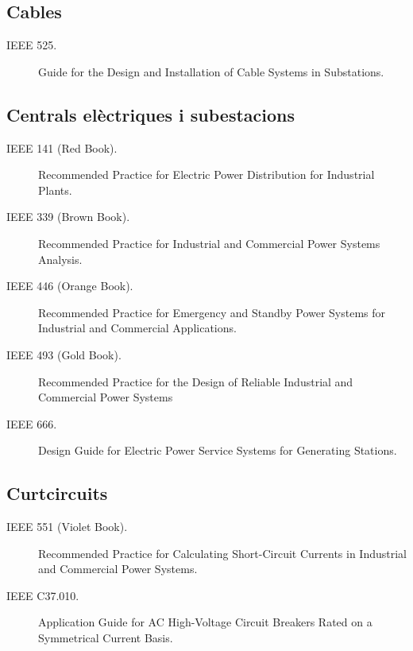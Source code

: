 \subsection*{Cables}
\begin{description}
    \item [\hspace{5mm}IEEE 525.] Guide for the Design and Installation of Cable Systems in Substations.
\end{description}

\subsection*{Centrals elèctriques i subestacions}
\begin{description}
    \item [\hspace{5mm}IEEE 141 (Red Book).] Recommended Practice for Electric Power Distribution for Industrial Plants.
    \item [\hspace{5mm}IEEE 339 (Brown Book).] Recommended Practice for Industrial and Commercial Power Systems Analysis.
    \item [\hspace{5mm}IEEE 446 (Orange Book).] Recommended Practice for Emergency and Standby Power Systems for Industrial and Commercial Applications.
    \item [\hspace{5mm}IEEE 493 (Gold Book).] Recommended Practice for the Design of Reliable Industrial and Commercial Power Systems 
    \item [\hspace{5mm}IEEE 666.] Design Guide for Electric Power Service Systems for Generating Stations.
\end{description}



\subsection*{Curtcircuits}
\begin{description}
    \item [\hspace{5mm}IEEE 551 (Violet Book).] Recommended Practice for Calculating Short-Circuit Currents in Industrial and Commercial Power Systems.
    \item [\hspace{5mm}IEEE C37.010.] Application Guide for AC High-Voltage Circuit Breakers Rated on a Symmetrical Current Basis.
\end{description}

